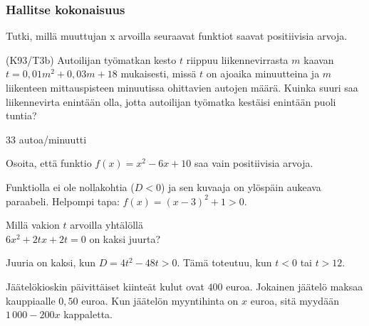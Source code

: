 \begin{tehtavasivu}
\subsubsection*{Hallitse kokonaisuus}

\begin{tehtava}
  Tutki, millä muuttujan x arvoilla seuraavat funktiot saavat positiivisia arvoja.

  \begin{vastaus}
  \end{vastaus}
\end{tehtava}

\begin{tehtava}
(K93/T3b) Autoilijan työmatkan kesto $t$ riippuu liikennevirrasta $m$ kaavan $t=0,01m^2+0,03m+18$ mukaisesti, missä $t$ on ajoaika minuutteina ja $m$ liikenteen mittauspisteen minuutissa ohittavien autojen määrä. Kuinka suuri saa liikennevirta enintään olla, jotta autoilijan työmatka kestäisi enintään puoli tuntia?
\begin{vastaus}
        $33$ autoa/minuutti
    \end{vastaus}
\end{tehtava}

\begin{tehtava}
	Osoita, että funktio $f(x)=x^2-6x+10 $ saa vain positiivisia arvoja.
    \begin{vastaus}
	Funktiolla ei ole nollakohtia ($D<0$) ja sen kuvaaja on ylöspäin aukeava paraabeli.
    Helpompi tapa: $f(x)= (x-3)^2+1 >0.$
    \end{vastaus}
\end{tehtava}

\begin{tehtava}
	Millä vakion $t$ arvoilla yhtälöllä \\ $6x^2+2tx+2t=0$ on kaksi juurta?
	\begin{vastaus}
		Juuria on kaksi, kun $D=4t^2-48t>0$. Tämä toteutuu, kun $t < 0$ tai $t > 12$.
	\end{vastaus}
\end{tehtava}

\begin{tehtava}
Jäätelökioskin päivittäiset kiinteät kulut ovat $400$ euroa. Jokainen jäätelö maksaa kauppiaalle $0,50$ euroa. Kun jäätelön myyntihinta on $x$ euroa, sitä myydään $1\,000 - 200x$ kappaletta. 
    \begin{vastaus}
    \end{vastaus}
\end{tehtava}


\end{tehtavasivu}
